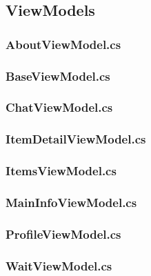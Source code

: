\documentclass{../includes/TechDoc}
\begin{document}
    \subsection{ViewModels}

    \subsubsection{AboutViewModel.cs}
    

    \subsubsection{BaseViewModel.cs}
    

    \subsubsection{ChatViewModel.cs}
    

    \subsubsection{ItemDetailViewModel.cs}
    

    \subsubsection{ItemsViewModel.cs}
    

    \subsubsection{MainInfoViewModel.cs}
    

    \subsubsection{ProfileViewModel.cs}
    

    \subsubsection{WaitViewModel.cs}
    
\end{document}
